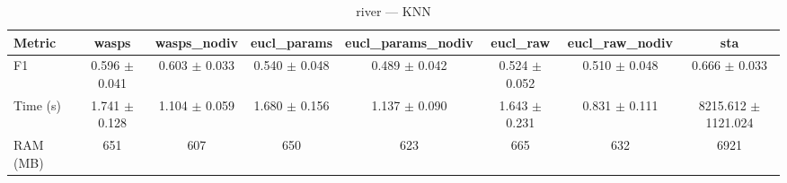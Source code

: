 \begin{table}[htbp]
\centering
\begin{NiceTabular}{lccccccc}
\toprule
Metric & wasps & wasps\_nodiv & eucl\_params & eucl\_params\_nodiv & eucl\_raw & eucl\_raw\_nodiv & sta \\
\midrule
F1 & 0.596 $\pm$ 0.041 & 0.603 $\pm$ 0.033 & 0.540 $\pm$ 0.048 & 0.489 $\pm$ 0.042 & 0.524 $\pm$ 0.052 & 0.510 $\pm$ 0.048 & 0.666 $\pm$ 0.033 \\
Time (s) & 1.741 $\pm$ 0.128 & 1.104 $\pm$ 0.059 & 1.680 $\pm$ 0.156 & 1.137 $\pm$ 0.090 & 1.643 $\pm$ 0.231 & 0.831 $\pm$ 0.111 & 8215.612 $\pm$ 1121.024 \\
RAM (MB) & 651 & 607 & 650 & 623 & 665 & 632 & 6921 \\
\bottomrule
\end{NiceTabular}
\caption{river --- KNN}
\label{tab:exp1_river_knn}
\end{table}
